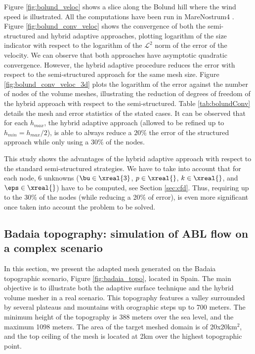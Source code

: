 \documentclass[1p]{elsarticle}
\begin{document}
Figure \ref{fig:bolund_veloc} shows a slice along the Bolund hill where the wind speed is illustrated.
All the computations have been run in MareNostrum4 \cite{MN4}. 
Figure \ref{fig:bolund_conv_veloc} shows the convergence of both the semi-structured and hybrid adaptive approaches, plotting logarithm of the  size indicator with respect to the logarithm of the $\mathcal{L}^2$ norm of the error of the velocity.
We can observe that both approaches have asymptotic quadratic convergence.
However, the hybrid adaptive procedure reduces the error with respect to the semi-structured approach for the same mesh size. 
Figure \ref{fig:bolund_conv_veloc_3d} plots the logarithm of the error against the number of nodes of the volume meshes, illustrating the reduction of degrees of freedom of the hybrid approach with respect to the semi-structured.
Table \ref{tab:bolundConv} details the mesh and error statistics of the stated cases. %
It can be observed that for each $h_{max}$, the hybrid adaptive approach (allowed to be refined up to $h_{min}=h_{max}/2$), is able to always reduce a $20\%$ the error of the structured approach while only using a $30\%$ of the nodes. 

This study shows the advantages of the hybrid adaptive approach with respect to the standard semi-structured strategies. 
We have to take into account that for each node, 6 unknowns ($\bu\in\xreal{3}$, $p\in\xreal{}$, $k\in\xreal{}$, and $\eps\in\xreal{}$) have to be computed, see Section \ref{sec:cfd}. Thus, requiring up to the 30\% of the nodes (while reducing a 20\% of error), is even more significant once taken into account the problem to be solved.


\subsection{Badaia topography: simulation of ABL flow on a complex scenario}
\label{sec:exampleBadaia}

In this section, we present the adapted mesh generated on the Badaia topographic scenario, Figure \ref{fig:badaia_topo}, located in Spain. 
The main objective is to illustrate both the adaptive surface technique and the hybrid volume mesher in a real scenario.
This topography features a valley surrounded by several plateaus and mountains with orographic steps up to 700 meters. 
The minimum height of the topography is 388 meters over the sea level, and the maximum 1098 meters.
The area of the target meshed domain is of 20x20km$^2$, and the top ceiling of the mesh is located at 2km over the highest topographic point.
\end{document}
